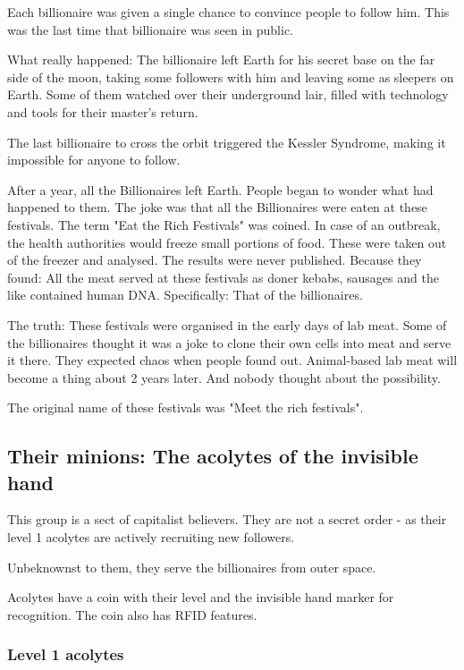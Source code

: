 Each billionaire was given a single chance to convince people to follow him. This was the last time that billionaire was seen in public.

What really happened: The billionaire left Earth for his secret base on the far side of the moon, taking some followers with him and leaving some as sleepers on Earth. Some of them watched over their underground lair, filled with technology and tools for their master's return.

The last billionaire to cross the orbit triggered the Kessler Syndrome, making it impossible for anyone to follow.

After a year, all the Billionaires left Earth. People began to wonder what had happened to them. The joke was that all the Billionaires were eaten at these festivals. The term "Eat the Rich Festivals" was coined. In case of an outbreak, the health authorities would freeze small portions of food. These were taken out of the freezer and analysed. The results were never published. Because they found: All the meat served at these festivals as doner kebabs, sausages and the like contained human DNA. Specifically: That of the billionaires.

The truth: These festivals were organised in the early days of lab meat. Some of the billionaires thought it was a joke to clone their own cells into meat and serve it there. They expected chaos when people found out. Animal-based lab meat will become a thing about 2 years later. And nobody thought about the possibility.

The original name of these festivals was "Meet the rich festivals".

\subsection{Their minions: The acolytes of the invisible hand}

This group is a sect of capitalist believers. They are not a secret order - as their level 1 acolytes are actively recruiting new followers.

Unbeknownst to them, they serve the billionaires from outer space.

Acolytes have a coin with their level and the invisible hand marker for recognition. The coin also has RFID features.

\subsubsection{Level 1 acolytes}

